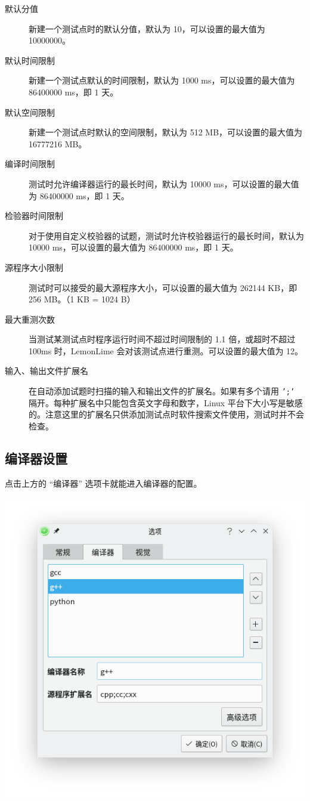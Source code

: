 \documentclass[UTF-8]{ctexart}
\begin{document}
				\begin{description}
					\item[默认分值] 新建一个测试点时的默认分值，默认为 10，可以设置的最大值为 10000000。
					\item[默认时间限制] 新建一个测试点默认的时间限制，默认为 1000 ms，可以设置的最大值为 86400000 ms，即 1 天。
					\item[默认空间限制] 新建一个测试点时默认的空间限制，默认为 512 MB，可以设置的最大值为 16777216 MB。
					\item[编译时间限制] 测试时允许编译器运行的最长时间，默认为 10000 ms，可以设置的最大值为 86400000 ms，即 1 天。
					\item[检验器时间限制] 对于使用自定义校验器的试题，测试时允许校验器运行的最长时间，默认为 10000 ms，可以设置的最大值为 86400000 ms，即 1 天。
					\item[源程序大小限制] 测试时可以接受的最大源程序大小，可以设置的最大值为 262144 KB，即 256 MB。（1 KB = 1024 B）
					\item[最大重测次数] 当测试某测试点时程序运行时间不超过时间限制的 1.1 倍，或超时不超过 100ms 时，LemonLime 会对该测试点进行重测。可以设置的最大值为 12。
					\item[输入、输出文件扩展名]  在自动添加试题时扫描的输入和输出文件的扩展名。如果有多个请用 \texttt{';'} 隔开。每种扩展名中只能包含英文字母和数字，Linux 平台下大小写是敏感的。注意这里的扩展名只供添加测试点时软件搜索文件使用，测试时并不会检查。
				\end{description}
		
			\subsection{编译器设置}
			
				点击上方的 “编译器” 选项卡就能进入编译器的配置。
				
				\begin{center}
					\includegraphics[scale=0.7]{pics/compilersettings.png}
				\end{center}
				
\end{document}
